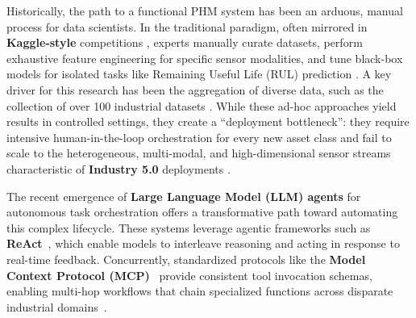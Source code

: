 \documentclass[sigconf,review]{acmart}
\begin{document}
Historically, the path to a functional PHM system has been an arduous, manual process for data scientists. In the traditional paradigm, often mirrored in \textbf{Kaggle-style} competitions \cite{ibm_enterprise_ops_2025}, experts manually curate datasets, perform exhaustive feature engineering for specific sensor modalities, and tune black-box models for isolated tasks like Remaining Useful Life (RUL) prediction \cite{hamilton2026neurosymbolicaipredictivemaintenance}. A key driver for this research has been the aggregation of diverse data, such as the collection of over 100 industrial datasets \cite{vanderVenIndustrialDatasets}. While these ad-hoc approaches yield results in controlled settings, they create a ``deployment bottleneck'': they require intensive human-in-the-loop orchestration for every new asset class and fail to scale to the heterogeneous, multi-modal, and high-dimensional sensor streams characteristic of \textbf{Industry 5.0} deployments \cite{wang2025itformer, yang2025phmbenchdomainspecificbenchmarkingframework}.

The recent emergence of \textbf{Large Language Model (LLM) agents} for autonomous task orchestration offers a transformative path toward automating this complex lifecycle. These systems leverage agentic frameworks such as \textbf{ReAct}~\cite{yao2023reactsynergizingreasoningacting}, which enable models to interleave reasoning and acting in response to real-time feedback. Concurrently, standardized protocols like the \textbf{Model Context Protocol (MCP)}~\cite{mcp_intro_2024} provide consistent tool invocation schemas, enabling multi-hop workflows that chain specialized functions across disparate industrial domains~\cite{wang2025mcpbenchbenchmarkingtoolusingllm}. 
\end{document}
